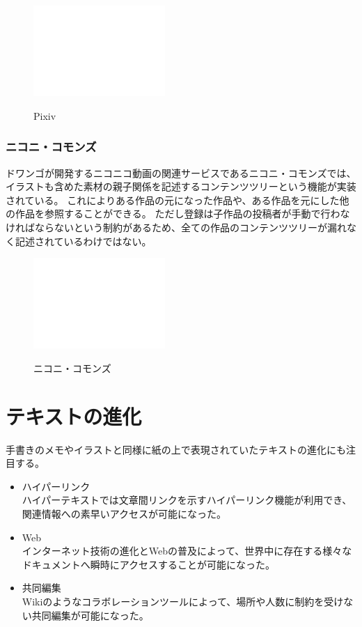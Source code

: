 \begin{figure}[htbp]
    \begin{center}
    {\includegraphics[width=50mm]{images/testimage.png}} \end{center}
    \caption{Pixiv}
\end{figure}


\subsubsection{ニコニ・コモンズ}

ドワンゴが開発するニコニコ動画の関連サービスであるニコニ・コモンズでは、イラストも含めた素材の親子関係を記述するコンテンツツリーという機能が実装されている。
これによりある作品の元になった作品や、ある作品を元にした他の作品を参照することができる。
ただし登録は子作品の投稿者が手動で行わなければならないという制約があるため、全ての作品のコンテンツツリーが漏れなく記述されているわけではない。

\begin{figure}[htbp]
    \begin{center}
    {\includegraphics[width=50mm]{images/testimage.png}} \end{center}
    \caption{ニコニ・コモンズ}
\end{figure}


\section{テキストの進化}
手書きのメモやイラストと同様に紙の上で表現されていたテキストの進化にも注目する。
\begin{itemize}
    \item ハイパーリンク\\
    ハイパーテキストでは文章間リンクを示すハイパーリンク機能が利用でき、関連情報への素早いアクセスが可能になった。
    \item Web\\
    インターネット技術の進化とWebの普及によって、世界中に存在する様々なドキュメントへ瞬時にアクセスすることが可能になった。
    \item 共同編集\\
    Wikiのようなコラボレーションツールによって、場所や人数に制約を受けない共同編集が可能になった。
\end{itemize}


